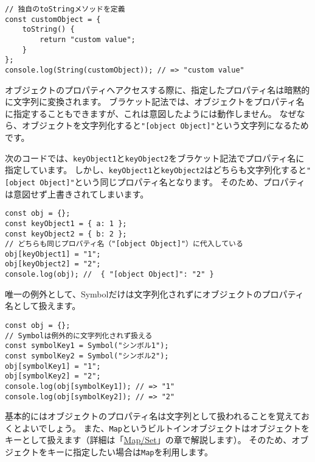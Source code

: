 \begin{lstlisting}
// 独自のtoStringメソッドを定義
const customObject = {
    toString() {
        return "custom value";
    }
};
console.log(String(customObject)); // => "custom value"
\end{lstlisting}
\vspace{-2mm}
\enlargethispage{\baselineskip}\begin{tcolorbox}[enhanced jigsaw,breakable,title=オブジェクトのプロパティ名は文字列化される]\label{object-property-is-to-string}

オブジェクトのプロパティへアクセスする際に、指定したプロパティ名は暗黙的に文字列に変換されます。
ブラケット記法では、オブジェクトをプロパティ名に指定することもできますが、これは意図したようには動作しません。
なぜなら、オブジェクトを文字列化すると\texttt{"[object Object]"}という文字列になるためです。

次のコードでは、\texttt{keyObject1}と\texttt{keyObject2}をブラケット記法でプロパティ名に指定しています。
しかし、\texttt{keyObject1}と\texttt{keyObject2}はどちらも文字列化すると\texttt{"[object Object]"}という同じプロパティ名となります。
そのため、プロパティは意図せず上書きされてしまいます。

\begin{lstlisting}
const obj = {};
const keyObject1 = { a: 1 };
const keyObject2 = { b: 2 };
// どちらも同じプロパティ名（"[object Object]"）に代入している
obj[keyObject1] = "1";
obj[keyObject2] = "2";
console.log(obj); //  { "[object Object]": "2" }
\end{lstlisting}
\vspace{-1mm}
唯一の例外として、Symbolだけは文字列化されずにオブジェクトのプロパティ名として扱えます。
\vspace{-2mm}
\begin{lstlisting}
const obj = {};
// Symbolは例外的に文字列化されず扱える
const symbolKey1 = Symbol("シンボル1");
const symbolKey2 = Symbol("シンボル2");
obj[symbolKey1] = "1";
obj[symbolKey2] = "2";
console.log(obj[symbolKey1]); // => "1"
console.log(obj[symbolKey2]); // => "2"
\end{lstlisting}
\vspace{-1mm}
\enlargethispage{\baselineskip}基本的にはオブジェクトのプロパティ名は文字列として扱われることを覚えておくとよいでしょう。
また、\texttt{Map}というビルトインオブジェクトはオブジェクトをキーとして扱えます（詳細は「\hyperlink{map-and-set}{Map/Set}」の章で解説します）。
そのため、オブジェクトをキーに指定したい場合は\texttt{Map}を利用します。
\end{tcolorbox}


